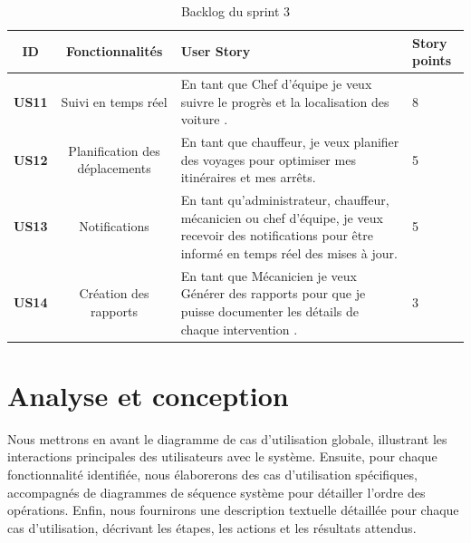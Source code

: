 \begin{table}[htbp]
    \centering
    \renewcommand{\arraystretch}{1.2} %
    \begin{tabular}{|c|c|p{7.8cm}|p{1cm}|}
        \hline
        \textbf{ID}   & \textbf{Fonctionnalités}       & \centering \textbf{User Story}                                                                                                                          & \textbf { Story points} \\
        \hline

        \textbf{US11} & Suivi en temps réel            & En tant que Chef d'équipe je veux suivre le progrès et la localisation des voiture .                                                                    & 8                       \\
        \hline
        \textbf{US12} & Planification des déplacements & En tant que chauffeur, je veux planifier des voyages pour optimiser mes itinéraires et mes arrêts.                                                      & 5                       \\
        \hline
        \textbf{US13} & Notifications                  & En tant qu’administrateur, chauffeur, mécanicien ou chef d’équipe, je veux recevoir des notifications pour être informé en temps réel des mises à jour. & 5                       \\
        \hline
        \textbf{US14} & Création des rapports          & En tant que Mécanicien je veux Générer des rapports pour que je puisse documenter les détails de chaque intervention .                                  & 3                       \\
        \hline
    \end{tabular}
    \caption{Backlog du sprint 3}

\end{table}

\section{Analyse et conception}

Nous mettrons en avant le diagramme de cas d'utilisation globale, illustrant les interactions principales des utilisateurs avec le système. Ensuite, pour chaque fonctionnalité identifiée, nous élaborerons des cas d'utilisation spécifiques, accompagnés de diagrammes de séquence système pour détailler l'ordre des opérations. Enfin, nous fournirons une description textuelle détaillée pour chaque cas d'utilisation, décrivant les étapes, les actions et les résultats attendus.

